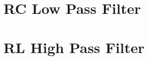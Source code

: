 \documentclass[a5paper,12pt]{article}
\begin{document}

\clearpage
\tableofcontents
\listoftables
\listoffigures
\clearpage

\section{RC Low Pass Filter}

\clearpage

\section{RL High Pass Filter}

\clearpage

\clearpage
{}
\printindex
\end{document}
